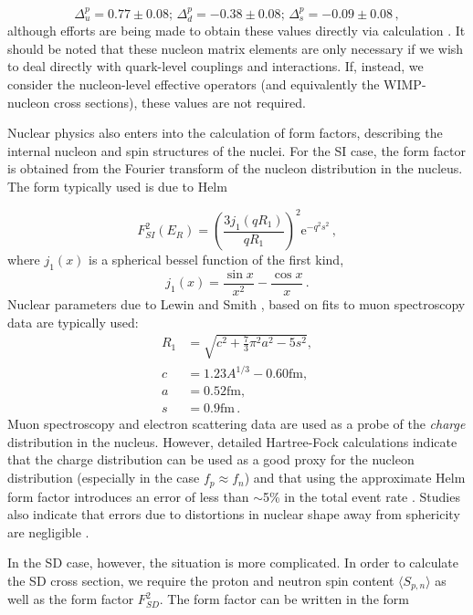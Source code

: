 \begin{equation}
\Delta_u^p = 0.77 \pm 0.08 ;\, \Delta_d^p = -0.38 \pm 0.08 ;\, \Delta_s^p = -0.09 \pm 0.08\,,
\end{equation}
although efforts are being made to obtain these values directly via calculation \cite{Qing:1998,Thomas:2008}. It should be noted that these nucleon matrix elements are only necessary if we wish to deal directly with quark-level couplings and interactions. If, instead, we consider the nucleon-level effective operators (and equivalently the WIMP-nucleon cross sections), these values are not required. %

Nuclear physics also enters into the calculation of form factors, describing the internal nucleon and spin structures of the nuclei. For the SI case, the form factor is obtained from the Fourier transform of the nucleon distribution in the nucleus. The form typically used is due to Helm \cite{Helm:1956}

\begin{equation}
F_{SI}^2(E_R) = \left(\frac{3j_1(qR_1)}{qR_1}\right)^2 \mathrm{e}^{-q^2s^2}\,,
\end{equation}
where $j_1(x)$ is a spherical bessel function of the first kind,
\begin{equation}
j_1(x) = \frac{\sin x}{x^2} - \frac{\cos x}{x}\,.
\end{equation}
Nuclear parameters due to Lewin and Smith \cite{Lewin:1996}, based on fits to muon spectroscopy data \cite{Fricke:1995} are typically used:
\begin{align}
R_1 & = \sqrt{c^2 + \frac{7}{3}\pi^2a^2 - 5s^2}, \\
c & = 1.23A^{1/3} - 0.60 \mathrm{ fm}, \\
a & = 0.52 \mathrm{ fm}, \\
s & = 0.9 \mathrm{ fm} \,.
\end{align}
Muon spectroscopy and electron scattering data \cite{Duda:2007} are used as a probe of the \textit{charge} distribution in the nucleus. However, detailed Hartree-Fock calculations indicate that the charge distribution can be used as a good proxy for the nucleon distribution (especially in the case $f_p \approx f_n$) and that using the approximate Helm form factor introduces an error of less than $\sim$5\% in the total event rate \cite{Co:2012}. Studies also indicate that errors due to distortions in nuclear shape away from sphericity are negligible \cite{Ya-Zheng:2012}.

In the SD case, however, the situation is more complicated. In order to calculate the SD cross section, we require the proton and neutron spin content $\langle S_{p,n} \rangle$ as well as the form factor $F_{SD}^2$. The form factor can be written in the form

